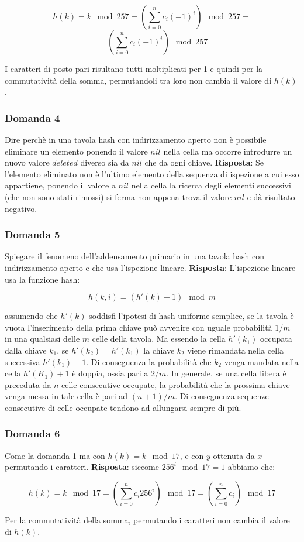$$h(k)=k\mod 257=(\sum_{i=0}^nc_i(-1)^i)\mod 257=$$
$$=(\sum_{i=0}^nc_i(-1)^i)\mod 257$$

I caratteri di posto pari risultano tutti moltiplicati per 1 e quindi per la commutatività della somma, permutandoli tra loro non cambia il valore di $h(k)$.

\subsubsection*{Domanda 4}

Dire perchè in una tavola hash con indirizzamento aperto non è possibile eliminare un elemento ponendo il valore $nil$ nella cella ma occorre introdurre un nuovo valore $deleted$ diverso sia da $nil$ che da ogni chiave.
\linebreak
\linebreak
\textbf{Risposta}: Se l'elemento eliminato non è l'ultimo elemento della sequenza di ispezione a cui esso appartiene, ponendo il valore a $nil$ nella cella la ricerca degli elementi successivi (che non sono stati rimossi) si ferma non appena trova il valore $nil$ e dà risultato negativo.

\subsubsection*{Domanda 5}

Spiegare il fenomeno dell'addensamento primario in una tavola hash con indirizzamento aperto e che usa l'ispezione lineare.
\linebreak
\linebreak
\textbf{Risposta}: L'ispezione lineare usa la funzione hash:

$$h(k,i)=(h'(k)+1)\mod m$$

assumendo che $h'(k)$ soddisfi l'ipotesi di hash uniforme semplice, se la tavola è vuota l'inserimento della prima chiave può avvenire con uguale probabilità $1/m$ in una qualsiasi delle $m$ celle della tavola. Ma essendo la cella $h'(k_1)$ occupata dalla chiave $k_1$, se $h'(k_2)=h'(k_1)$ la chiave $k_2$ viene rimandata nella cella successiva $h'(k_1)+1$. Di conseguenza la probabilità che $k_2$ venga mandata nella cella $h'(K_1)+1$ è doppia, ossia pari a $2/m$. In generale, se una cella libera è preceduta da $n$ celle consecutive occupate, la probabilità che la prossima chiave venga messa in tale cella è pari ad $(n+1)/m$. Di conseguenza sequenze consecutive di celle occupate tendono ad allungarsi sempre di più.

\subsubsection*{Domanda 6}

Come la domanda 1 ma con $h(k)=k\mod 17$, e con $y$ ottenuta da $x$ permutando i caratteri.
\linebreak
\linebreak
\textbf{Risposta}: siccome $256^i\mod 17 = 1$ abbiamo che:

$$h(k)=k\mod 17 = (\sum_{i=0}^nc_i256^i)\mod 17=(\sum_{i=0}^nc_i)\mod 17$$

Per la commutatività della somma, permutando i caratteri non cambia il valore di $h(k)$.

